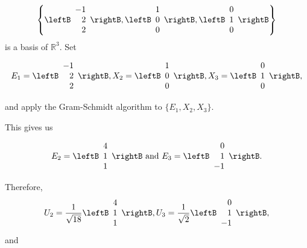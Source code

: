 \begin{solution}
\[ \left\{ \leftB\begin{array}{r} -1 \\ 2 \\ 2 \end{array}\rightB,
\leftB\begin{array}{r} 1 \\ 0 \\ 0 \end{array}\rightB,
\leftB\begin{array}{r} 0 \\ 1 \\ 0 \end{array}\rightB\right\}\]
is a basis of $\mathbb{R}^3$.  Set

\[ E_1 = \leftB\begin{array}{r} -1 \\ 2 \\ 2 \end{array}\rightB,
X_2 = \leftB\begin{array}{r} 1 \\ 0 \\ 0 \end{array}\rightB,
X_3 =\leftB\begin{array}{r} 0 \\ 1 \\ 0 \end{array}\rightB,\]

and apply the Gram-Schmidt algorithm to
$\{ E_1, X_2, X_3\}$.

This gives us

\[ E_2 = \leftB\begin{array}{r} 4 \\ 1 \\ 1 \end{array}\rightB
\mbox{ and }
E_3 = \leftB\begin{array}{r} 0 \\ 1 \\ -1 \end{array}\rightB.\]

Therefore,
\[ U_2 = \frac{1}{\sqrt{18}}
 \leftB\begin{array}{r} 4 \\ 1 \\ 1 \end{array}\rightB,
U_3 = \frac{1}{\sqrt 2}
\leftB\begin{array}{r} 0 \\ 1 \\ -1 \end{array}\rightB,\]
and


\end{solution}
